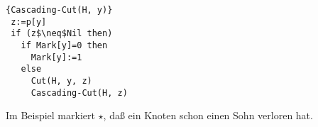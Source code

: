 \begin{Algorithmus}[H]
\begin{lstlisting}[frame=tlrb, mathescape=true, title=\textsc{Cascading-Cut\textnormal{(H, y)}}, gobble=1]{Cascading-Cut(H, y)}
 z:=p[y]
 if (z$\neq$Nil then)
   if Mark[y]=0 then
     Mark[y]:=1
   else
     Cut(H, y, z)
     Cascading-Cut(H, z)  
\end{lstlisting}
\end{Algorithmus}

Im Beispiel markiert $\star$, daß ein Knoten schon einen Sohn verloren hat.

